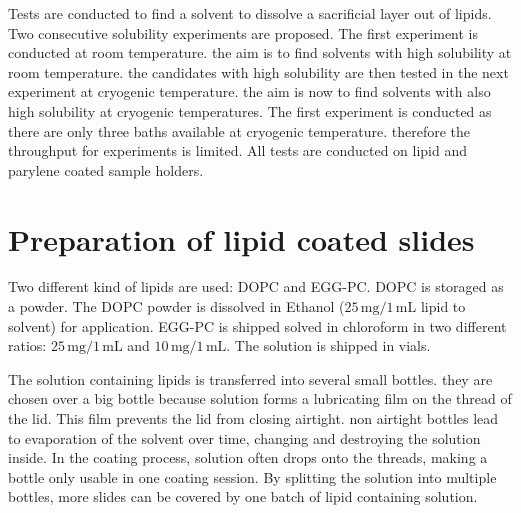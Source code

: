 Tests are conducted to find a solvent to dissolve a sacrificial layer out of lipids. Two consecutive solubility experiments are proposed. The first experiment is conducted at room temperature. the aim is to find solvents with high solubility at room temperature. the candidates with high solubility are then tested in the next experiment at cryogenic temperature. the aim is now to find solvents with also high solubility at cryogenic temperatures. The first experiment is conducted as there are only three baths available at cryogenic temperature. therefore the throughput for experiments is limited. All tests are conducted on lipid and parylene coated sample holders.

\section{Preparation of lipid coated slides}

Two different kind of lipids are used: DOPC and EGG-PC. DOPC is storaged as a powder. The DOPC powder is dissolved in Ethanol ($25\,\si{\milli\gram}/1\,\si{\milli\liter}$ lipid to solvent) for application. EGG-PC is shipped solved in chloroform in two different ratios: $25\,\si{\milli\gram}/1\,\si{\milli\liter}$ and $10\,\si{\milli\gram}/1\,\si{\milli\liter}$. The solution is shipped in vials.

The solution containing lipids is transferred into several small bottles. they are chosen over a big bottle because solution forms a lubricating film on the thread of the lid. This film prevents the lid from closing airtight. non airtight bottles lead to evaporation of the solvent over time, changing and destroying the solution inside. In the coating process, solution often drops onto the threads, making a bottle only usable in one coating session. By splitting the solution into multiple bottles, more slides can be covered by one batch of lipid containing solution.




